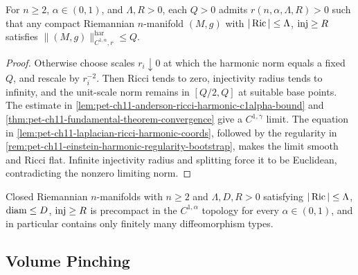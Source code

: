 \begin{theorem}
  \label{thm:pet-ch11-anderson-injectivity-radius-controls-norm}
  For $n\ge2$, $\alpha\in(0,1)$, and $\Lambda,R>0$, each $Q>0$ admits
  $r(n,\alpha,\Lambda,R)>0$ such that any compact Riemannian $n$-manifold
  $(M,g)$ with $|\operatorname{Ric}|\le\Lambda$, $\operatorname{inj}\ge R$ satisfies
  $\|(M,g)\|^{\mathrm{har}}_{C^{1,\alpha},r}\le Q$.
\end{theorem}
\begin{proof}
  \sketch
  Otherwise choose scales \(r_i\downarrow0\) at which the harmonic norm equals a fixed \(Q\), and rescale by \(r_i^{-2}\). Then Ricci tends to zero, injectivity radius tends to infinity, and the unit-scale norm remains in \([Q/2,Q]\) at suitable base points. The estimate in \cref{lem:pet-ch11-anderson-ricci-harmonic-c1alpha-bound} and \cref{thm:pet-ch11-fundamental-theorem-convergence} give a \(C^{1,\gamma}\) limit. The equation in \cref{lem:pet-ch11-laplacian-ricci-harmonic-coords}, followed by the regularity in \cref{rem:pet-ch11-einstein-harmonic-regularity-bootstrap}, makes the limit smooth and Ricci flat. Infinite injectivity radius and splitting force it to be Euclidean, contradicting the nonzero limiting norm.
\end{proof}


\begin{corollary}
  \label{cor:pet-ch11-anderson-diffeo-finiteness-injectivity}
  Closed Riemannian $n$-manifolds with $n\ge2$ and
  $\Lambda,D,R>0$ satisfying
  $|\operatorname{Ric}|\le\Lambda$, $\operatorname{diam}\le D$, $\operatorname{inj}\ge R$ is precompact in the
  $C^{1,\alpha}$ topology for every $\alpha\in(0,1)$, and in particular
  contains only finitely many diffeomorphism types.
\end{corollary}

\subsection{Volume Pinching}

